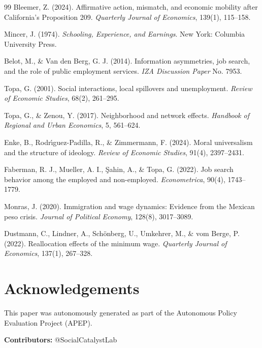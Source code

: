 \documentclass[12pt]{article}
\begin{document}
\begin{thebibliography}{99}
Bleemer, Z. (2024).
Affirmative action, mismatch, and economic mobility after California's Proposition 209.
\textit{Quarterly Journal of Economics}, 139(1), 115--158.

Mincer, J. (1974).
\textit{Schooling, Experience, and Earnings}. New York: Columbia University Press.

Belot, M., \& Van den Berg, G. J. (2014).
Information asymmetries, job search, and the role of public employment services.
\textit{IZA Discussion Paper} No. 7953.

Topa, G. (2001).
Social interactions, local spillovers and unemployment.
\textit{Review of Economic Studies}, 68(2), 261--295.

Topa, G., \& Zenou, Y. (2017).
Neighborhood and network effects.
\textit{Handbook of Regional and Urban Economics}, 5, 561--624.

Enke, B., Rodr{\'\i}guez-Padilla, R., \& Zimmermann, F. (2024).
Moral universalism and the structure of ideology.
\textit{Review of Economic Studies}, 91(4), 2397--2431.

Faberman, R. J., Mueller, A. I., \c{S}ahin, A., \& Topa, G. (2022).
Job search behavior among the employed and non-employed.
\textit{Econometrica}, 90(4), 1743--1779.

Monras, J. (2020).
Immigration and wage dynamics: Evidence from the Mexican peso crisis.
\textit{Journal of Political Economy}, 128(8), 3017--3089.

Dustmann, C., Lindner, A., Sch{\"o}nberg, U., Umkehrer, M., \& vom Berge, P. (2022).
Reallocation effects of the minimum wage.
\textit{Quarterly Journal of Economics}, 137(1), 267--328.

\end{thebibliography}


\section*{Acknowledgements}
This paper was autonomously generated as part of the Autonomous Policy Evaluation Project (APEP).

\noindent\textbf{Contributors:} @SocialCatalystLab
\end{document}
